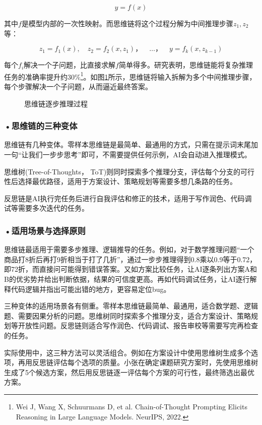 \[
y = f(x)
\]

其中$f$是模型内部的一次性映射。而思维链将这个过程分解为中间推理步骤$z_1, z_2$等：

\[
z_1 = f_1(x),  \quad z_2 = f_2(x, z_1)， \quad \dots， \quad y = f_k(x, z_{k-1})
\]

每个$f_i$解决一个子问题，比直接求解$f$简单得多。研究表明，思维链能将复杂推理任务的准确率提升约30\%\footnote{Wei J, Wang X, Schuurmans D, et al. Chain-of-Thought Prompting Elicits Reasoning in Large Language Models. NeurIPS, 2022.}。如图\ref{fig:ch3_3_9}所示，思维链将输入拆解为多个中间推理步骤，每个步骤解决一个子问题，从而逼近最终答案。

\begin{figure}[H]
\centering
{}
\caption{思维链逐步推理过程}
\label{fig:ch3_3_9}
\end{figure}

\subsubsection*{\textbf{•思维链的三种变体}}

思维链有几种变体。零样本思维链是最简单、最通用的方式，只需在提示词末尾加一句“让我们一步步思考”即可，不需要提供任何示例，AI会自动进入推理模式。

思维树(Tree-of-Thoughts， ToT)则同时探索多个推理分支，评估每个分支的可行性后选择最优路径，适用于方案设计、策略规划等需要多想几条路的任务。

反思链是AI执行完任务后进行自我评估和修正的技术，适用于写作润色、代码调试等需要多次迭代的任务。 


\subsubsection*{\textbf{•适用场景与选择原则}}

思维链最适用于需要多步推理、逻辑推导的任务。例如，对于数学推理问题“一个商品打8折后再打9折相当于打了几折”，通过一步步推理得到0.8乘以0.9等于0.72，即72折，而直接问可能得到错误答案。又如方案比较任务，让AI逐条列出方案A和B的优劣势并给出判断依据，结果的可信度更高。再如代码调试任务，让AI逐行解释代码逻辑并指出可能出错的地方，更容易定位bug。


三种变体的适用场景各有侧重。零样本思维链最简单、最通用，适合数学题、逻辑题、需要因果分析的问题。思维树同时探索多个推理分支，适合方案设计、策略规划等开放性问题。反思链则适合写作润色、代码调试、报告审校等需要写完再检查的任务。

实际使用中，这三种方法可以灵活组合。例如在方案设计中使用思维树生成多个选项，再用反思链评估每个选项的质量。小张在确定课题研究方案时，先使用思维树生成了5个候选方案，然后用反思链逐一评估每个方案的可行性，最终筛选出最优方案。


